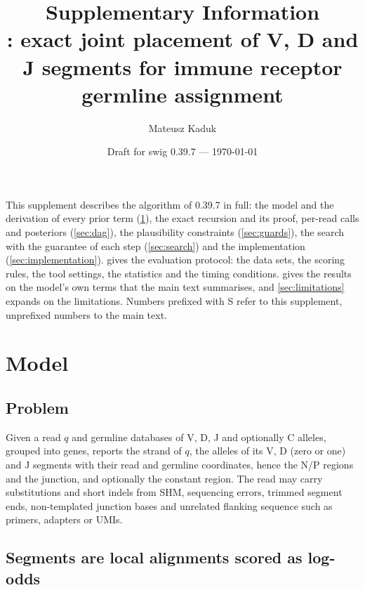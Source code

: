 \documentclass[11pt,a4paper]{article}
\title{Supplementary Information\\[0.4em]
\large \swig: exact joint placement of V, D and J segments
for immune receptor germline assignment}
\author{Mateusz Kaduk}
\date{Draft for swig 0.39.7 --- \today}
\begin{document}
\maketitle

\noindent This supplement describes the algorithm of \swig{} 0.39.7 in
full: the model and the derivation of every prior term
(\cref{sec:model}), the exact recursion and its proof, per-read calls and
posteriors (\cref{sec:dag}), the plausibility constraints
(\cref{sec:guards}), the search with the guarantee of each step
(\cref{sec:search}) and the implementation (\cref{sec:implementation}).
 gives the evaluation protocol: the data sets, the
scoring rules, the tool settings, the statistics and the timing conditions.
 gives the results on the model's own terms that the
main text summarises, and \cref{sec:limitations} expands on the limitations.
Numbers prefixed with S refer to this supplement, unprefixed numbers to the
main text.

\tableofcontents

\section{Model}
\label{sec:model}

\subsection{Problem}

Given a read $q$ and germline databases of V, D, J and optionally C alleles,
grouped into genes, \swig{} reports the strand of $q$, the alleles of its V,
D (zero or one) and J segments with their read and germline coordinates,
hence the N/P regions and the junction, and optionally the constant region.
The read may carry substitutions and short indels from SHM, sequencing
errors, trimmed segment ends, non-templated junction bases and unrelated
flanking sequence such as primers, adapters or UMIs.

\subsection{Segments are local alignments scored as log-odds}
\label{sec:scores}
\end{document}
